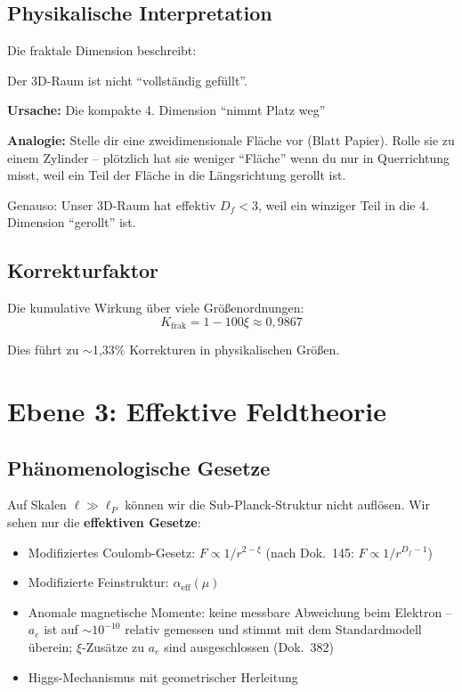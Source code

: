 	\subsection{Physikalische Interpretation}
	
	Die fraktale Dimension beschreibt:
	
	\begin{philosophical}
		Der 3D-Raum ist nicht \enquote{vollständig gefüllt}.
		
		\vspace{0.3cm}
		
		\textbf{Ursache:} Die kompakte 4. Dimension \enquote{nimmt Platz weg}
		
		\vspace{0.3cm}
		
		\textbf{Analogie:}
		Stelle dir eine zweidimensionale Fläche vor (Blatt Papier). Rolle sie zu einem Zylinder -- plötzlich hat sie weniger \enquote{Fläche} wenn du nur in Querrichtung misst, weil ein Teil der Fläche in die Längsrichtung gerollt ist.
		
		Genauso: Unser 3D-Raum hat effektiv $D_f < 3$, weil ein winziger Teil in die 4. Dimension \enquote{gerollt} ist.
	\end{philosophical}
	
	\subsection{Korrekturfaktor}
	
	Die kumulative Wirkung über viele Größenordnungen:
	\begin{equation}
		K_{\text{frak}} = 1 - 100\xi \approx 0{,}9867
	\end{equation}
	
	Dies führt zu $\sim$1{,}33\% Korrekturen in physikalischen Größen.
	
	\section{Ebene 3: Effektive Feldtheorie}
	
	\subsection{Phänomenologische Gesetze}
	
	Auf Skalen $\ell \gg \ell_P$ können wir die Sub-Planck-Struktur nicht auflösen. Wir sehen nur die \textbf{effektiven Gesetze}:
	
	\begin{itemize}
		\item Modifiziertes Coulomb-Gesetz: $F \propto 1/r^{2-\xi}$ (nach Dok.~145: $F \propto 1/r^{D_f-1}$)
		\item Modifizierte Feinstruktur: $\alpha_{\text{eff}}(\mu)$
		\item Anomale magnetische Momente: keine messbare Abweichung beim Elektron -- $a_e$ ist auf $\sim10^{-10}$ relativ gemessen und stimmt mit dem Standardmodell überein; $\xi$-Zusätze zu $a_e$ sind ausgeschlossen (Dok.~382)
		\item Higgs-Mechanismus mit geometrischer Herleitung
	\end{itemize}
	
